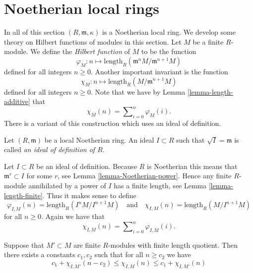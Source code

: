 \section{Noetherian local rings}
\label{section-Noetherian-local}

\noindent
In all of this section $(R, \mathfrak m, \kappa)$ is a Noetherian local ring.
We develop some theory on Hilbert functions of modules in this section.
Let $M$ be a finite $R$-module. We define the {\it Hilbert function}
of $M$ to be the function
$$
\varphi_M : n
\longmapsto
\text{length}_R(\mathfrak m^nM/{\mathfrak m}^{n + 1}M)
$$
defined for all integers $n \geq 0$. Another important invariant is the
function
$$
\chi_M : n
\longmapsto
\text{length}_R(M/{\mathfrak m}^{n + 1}M)
$$
defined for all integers $n \geq 0$.
Note that we have by Lemma \ref{lemma-length-additive}
that
$$
\chi_M(n) = \sum\nolimits_{i = 0}^n \varphi_M(i).
$$
There is a variant of this construction which uses an ideal of definition.

\begin{definition}
\label{definition-ideal-definition}
Let $(R, \mathfrak m)$ be a local Noetherian ring.
An ideal $I \subset R$ such that $\sqrt{I} = \mathfrak m$ is called
{\it an ideal of definition of $R$}.
\end{definition}

\noindent
Let $I \subset R$ be an ideal of definition.
Because $R$ is Noetherian this means that
$\mathfrak m^r \subset I$ for some $r$, see Lemma
\ref{lemma-Noetherian-power}. Hence any finite $R$-module
annihilated by a power of $I$ has a finite length, see Lemma
\ref{lemma-length-finite}.
Thus it makes sense to define
$$
\varphi_{I, M}(n) = \text{length}_R(I^nM/I^{n + 1}M)
\quad\text{and}\quad
\chi_{I, M}(n) = \text{length}_R(M/I^{n + 1}M)
$$
for all $n \geq 0$. Again we have that
$$
\chi_{I, M}(n) = \sum\nolimits_{i = 0}^n \varphi_{I, M}(i).
$$

\begin{lemma}
\label{lemma-differ-finite}
Suppose that $M' \subset M$ are finite $R$-modules
with finite length quotient. Then there exists a
constants $c_1, c_2$ such that for all $n \geq c_2$ we have
$$
c_1 + \chi_{I, M'}(n - c_2) \leq \chi_{I, M}(n) \leq
c_1 + \chi_{I, M'}(n)
$$
\end{lemma}

